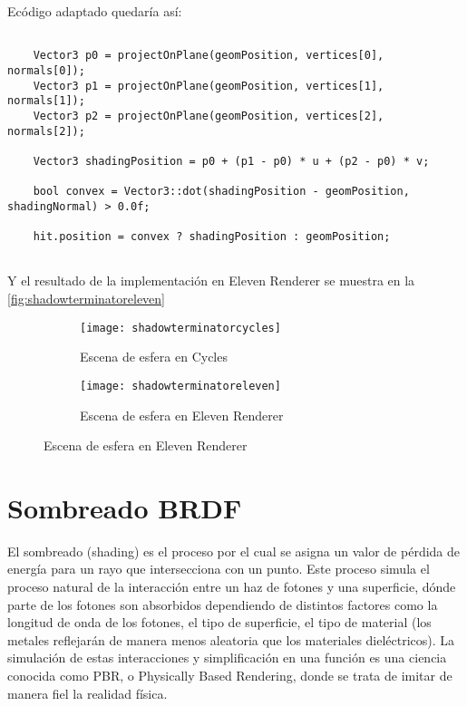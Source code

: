 Ecódigo adaptado quedaría así:
	
\begin{lstlisting}
	
	Vector3 p0 = projectOnPlane(geomPosition, vertices[0], normals[0]);
    Vector3 p1 = projectOnPlane(geomPosition, vertices[1], normals[1]);
    Vector3 p2 = projectOnPlane(geomPosition, vertices[2], normals[2]);

    Vector3 shadingPosition = p0 + (p1 - p0) * u + (p2 - p0) * v;

    bool convex = Vector3::dot(shadingPosition - geomPosition, shadingNormal) > 0.0f;
	
	hit.position = convex ? shadingPosition : geomPosition;
	
\end{lstlisting}

Y el resultado de la implementación en Eleven Renderer se muestra en la \autoref{fig:shadowterminatoreleven}

\begin{figure}[H]
	\centering
	  \begin{subfigure}[b]{0.4\textwidth}
		\texttt{[image: shadowterminatorcycles]}
		\caption{Escena de esfera en Cycles}
		\label{fig:shadowterminatorcycles}
	  \end{subfigure}
	 \hfill
	  \begin{subfigure}[b]{0.4\textwidth}
		\texttt{[image: shadowterminatoreleven]}
		\caption{Escena de esfera en Eleven Renderer}
		\label{fig:shadowterminatoreleven}
	  \end{subfigure}
	 \hfill
\end{figure}
	
\section{Sombreado BRDF}
	
El sombreado (shading) es el proceso por el cual se asigna un valor de pérdida de energía para un rayo que intersecciona con un punto. Este proceso simula el proceso natural de la interacción entre un haz de fotones y una superficie, dónde parte de los fotones son absorbidos dependiendo de distintos factores como la longitud de onda de los fotones, el tipo de superficie, el tipo de material (los metales reflejarán de manera menos aleatoria que los materiales dieléctricos). La simulación de estas interacciones y simplificación en una función es una ciencia conocida como PBR, o Physically Based Rendering, donde se trata de imitar de manera fiel la realidad física. 
		
